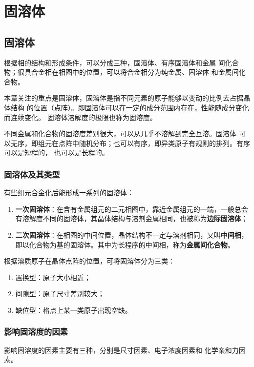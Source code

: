 \chapter{固溶体}
    \section{固溶体}
        根据相的结构和形成条件，可以分成三种，固溶体、有序固溶体和金属
        间化合物；很具合金相在相图中的位置，可以将合金相分为纯金属、固溶体
        和金属间化合物。

        本章关注的重点是固溶体，固溶体是指不同元素的原子能够以变动的比例去占据晶体结构
        的位置（点阵）。即固溶体可以在一定的成分范围内存在，性能随成分变化而连续变化。
        固溶体溶解度的极限也称为固溶度。

        不同金属和化合物的固溶度差别很大，可以从几乎不溶解到完全互溶。固溶体
        可以无序，即组元在点阵中随机分布；也可以有序，即异类原子有规则的排列。有序可以是短程的，
        也可以是长程的。

        \subsection{固溶体及其类型}
            有些组元合金化后能形成一系列的固溶体：
            \begin{enumerate}
                \item \textbf{一次固溶体}：在含有金属组元的二元相图中，靠近金属组元的一端，一般总会有溶解度不同的固溶体，其晶体结构与溶剂金属相同，也被称为\textbf{边际固溶体}；
                \item \textbf{二次固溶体}：在相图的中间位置，晶体结构不一定与溶剂相同，又叫\textbf{中间相}，即以化合物为基的固溶体。其中为长程序的中间相，称为\textbf{金属间化合物}。
            \end{enumerate}

            根据溶质原子在晶体点阵的位置，可将固溶体分为三类：
            \begin{enumerate}
                \item 置换型：原子大小相近；
                \item 间隙型：原子尺寸差别较大；
                \item 缺位型：格点上某一类原子出现空缺。
            \end{enumerate}
        \subsection{影响固溶度的因素}
            影响固溶度的因素主要有三种，分别是尺寸因素、电子浓度因素和
            化学亲和力因素。
